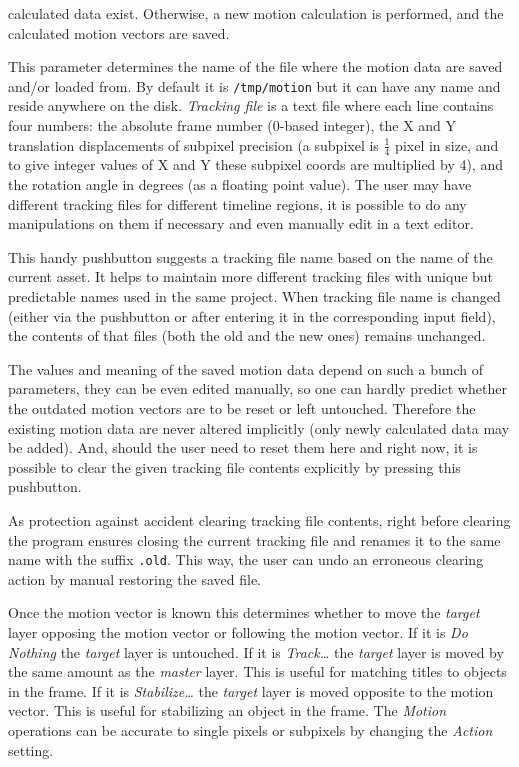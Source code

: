 \begin{description}
    calculated data exist.  Otherwise, a new motion calculation is performed,
    and the calculated motion vectors are saved.
    \item[Tracking file] This parameter determines the name of the file where the
    motion data are saved and/or loaded from.  By default it is \texttt{/tmp/motion}
    but it can have any name and reside anywhere on the disk.  \textit{Tracking file} is
    a text file where each line contains four numbers: the absolute frame number
    (0-based integer), the X and Y translation displacements of subpixel
    precision (a subpixel is $\frac{1}{4}$ pixel in size, and to give integer values of X and Y these subpixel coords are multiplied by 4), and the rotation angle in
    degrees (as a floating point value).  The user may have different tracking
    files for different timeline regions, it is possible to do any manipulations
    on them if necessary and even manually edit in a text editor.
    \item[Generate tracking file name] This handy pushbutton suggests a tracking file
    name based on the name of the current asset.  It helps to maintain more
    different tracking files with unique but predictable names used in the same
    project.  When tracking file name is changed (either via the pushbutton or
    after entering it in the corresponding input field), the contents of that
    files (both the old and the new ones) remains unchanged.
    \item[Clear tracking file contents] The values and meaning of the saved motion data depend on such a bunch of parameters, they can be even edited manually, so
    one can hardly predict whether the outdated motion vectors are to be reset
    or left untouched.  Therefore the existing motion data are never altered
    implicitly (only newly calculated data may be added).  And, should the user
    need to reset them here and right now, it is possible to clear the given
    tracking file contents explicitly by pressing this pushbutton.
    
    As protection against accident clearing tracking file contents, right before
    clearing the program ensures closing the current tracking file and renames
    it to the same name with the suffix \texttt{.old}.  This way, the user can undo an erroneous clearing action by manual restoring the saved file.
    \item[Action] Once the motion vector is known this determines whether to move the \textit{target} layer opposing the motion vector or following the motion vector. If it is \textit{Do Nothing} the \textit{target} layer is untouched. If it is \textit{Track\dots} the \textit{target} layer is moved by the same amount as the \textit{master} layer. This is useful for matching titles to objects in the frame. If it is \textit{Stabilize\dots} the \textit{target} layer is moved opposite to the motion vector. This is useful for stabilizing an object in the frame. The \textit{Motion} operations can be accurate to single pixels or subpixels by changing the \textit{Action} setting.
\end{description}

